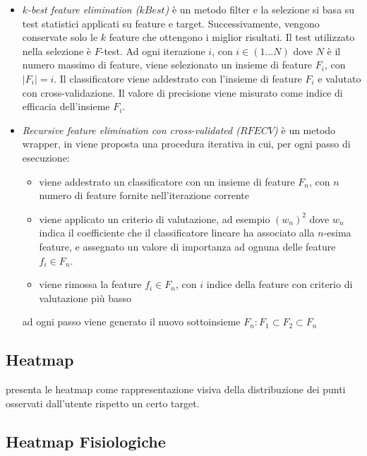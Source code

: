 \begin{itemize}
  \item \textit{$k$-best feature elimination ($kBest$)} è un metodo filter e la selezione si basa su test statistici applicati su feature e target. Successivamente, vengono conservate solo le $k$ feature che ottengono i miglior risultati. Il test utilizzato nella selezione è $F$-test. Ad ogni iterazione $i$, con $i \in (1 \dots N)$ dove $N$ è il numero massimo di feature, viene selezionato un insieme di feature $F_{i}$, con $|F_{i}|=i$. Il classificatore viene addestrato con l'insieme di feature $F_{i}$ e valutato con cross-validazione. Il valore di precisione viene misurato come indice di efficacia dell'insieme $F_{i}$.

  \item \textit{Recursive feature elimination con cross-validated ($RFECV$)} è un metodo wrapper, in \cite{weston2001feature} viene proposta una procedura iterativa in cui, per ogni passo di esecuzione:
  \begin{itemize}
    \item viene addestrato un classificatore con un insieme di feature $F_{n}$, con $n$ numero di feature fornite nell'iterazione corrente
    \item viene applicato un criterio di valutazione, ad esempio $(w_{n})^2$ dove $w_{n}$ indica il coefficiente che il classificatore lineare ha associato alla $n$-esima feature, e assegnato un valore di importanza ad ognuna delle feature $f_{i} \in F_{n}$.
    \item viene rimossa la feature $f_{i} \in F_{n}$, con $i$ indice della feature con criterio di valutazione più basso
  \end{itemize}
  ad ogni passo viene generato il nuovo sottoinsieme $F_{n} : F_{1} \subset F_{2} \subset F_{n}$
\end{itemize}


\subsection{Heatmap}

\cite{pomplun1996disambiguating} presenta le heatmap come rappresentazione visiva della distribuzione dei punti osservati dall'utente rispetto un certo target.

\subsection{Heatmap Fisiologiche}

